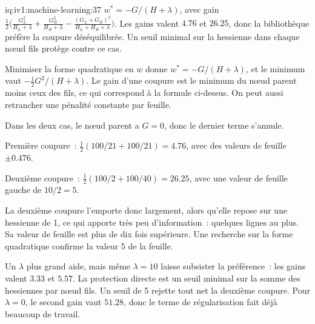 \begin{solution}{iq:iv1:machine-learning:37}
$w^* = -G/(H + \lambda)$, avec gain $\frac12\bigl(\frac{G_L^2}{H_L + \lambda} + \frac{G_R^2}{H_R + \lambda} - \frac{(G_L + G_R)^2}{H_L + H_R + \lambda}\bigr)$. Les gains valent $4.76$ et $26.25$, donc la bibliothèque préfère la coupure déséquilibrée. Un seuil minimal sur la hessienne dans chaque nœud fils protège contre ce cas.

Minimiser la forme quadratique en $w$ donne $w^* = -G/(H + \lambda)$, et le minimum vaut $-\frac12G^2/(H + \lambda)$. Le gain d'une coupure est le minimum du nœud parent moins ceux des fils, ce qui correspond à la formule ci-dessus. On peut aussi retrancher une pénalité constante par feuille.

Dans les deux cas, le nœud parent a $G = 0$, donc le dernier terme s'annule.

Première coupure~: $\frac12(100/21 + 100/21) = 4.76$, avec des valeurs de feuille $\pm 0.476$.

Deuxième coupure~: $\frac12(100/2 + 100/40) = 26.25$, avec une valeur de feuille gauche de $10/2 = 5$.

La deuxième coupure l'emporte donc largement, alors qu'elle repose sur une hessienne de 1, ce qui apporte très peu d'information~: quelques lignes au plus. Sa valeur de feuille est plus de dix fois supérieure. Une recherche sur la forme quadratique confirme la valeur 5 de la feuille.

Un $\lambda$ plus grand aide, mais même $\lambda = 10$ laisse subsister la préférence~: les gains valent $3.33$ et $5.57$. La protection directe est un seuil minimal sur la somme des hessiennes par nœud fils. Un seuil de 5 rejette tout net la deuxième coupure. Pour $\lambda = 0$, le second gain vaut $51.28$, donc le terme de régularisation fait déjà beaucoup de travail.



\end{solution}

